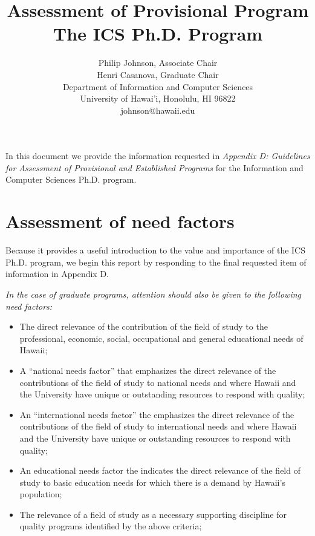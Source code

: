 \documentclass[12pt]{article}
\begin{document}
\title{ Assessment of Provisional Program\\
        {\bf The ICS Ph.D. Program}}


\author{Philip Johnson, Associate Chair \\
        Henri Casanova, Graduate Chair \\
        Department of Information and Computer Sciences \\
        University of Hawai'i,  Honolulu, HI 96822 \\
        johnson@hawaii.edu
}

\maketitle

\tableofcontents

\newpage

In this document we provide the information requested in {\em Appendix D:
Guidelines for Assessment of Provisional and Established Programs} for the
Information and Computer Sciences Ph.D. program.

\section{Assessment of need factors}

Because it provides a useful introduction to the value and importance of the ICS
Ph.D. program, we begin this report by responding to the final requested
item of information in Appendix D.

{\em
\medskip \noindent In the case of graduate programs, attention should also be given to the
following need factors:
\begin{itemize}
\item The direct relevance of the contribution of the field of study to the
  professional, economic, social, occupational and general educational
  needs of Hawaii; 
\item A ``national needs factor'' that emphasizes the direct relevance of
  the contributions of the field of study to national needs and where
  Hawaii and the University have unique or outstanding resources to
  respond with quality;
\item An ``international needs factor'' the emphasizes the direct relevance of
  the contributions of the field of study to international needs and where
  Hawaii and the University have unique or outstanding resources to
  respond with quality;
\item An educational needs factor the indicates the direct relevance of the
  field of study to basic education needs for which there is a demand by
  Hawaii's population;
\item The relevance of a field of study as a necessary supporting
  discipline for quality programs identified by the above criteria;
\end{itemize}
}
\end{document}
